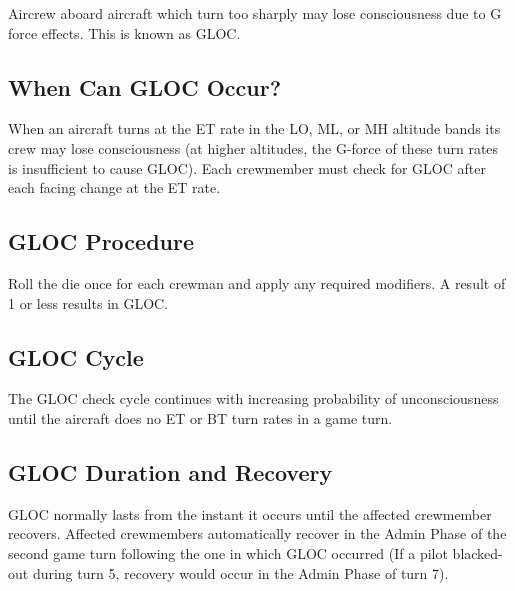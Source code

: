 \begin{advancedrules}
    Aircrew aboard aircraft which turn too sharply may lose consciousness due to G force effects. This is known as GLOC.

    \subsection{When Can GLOC Occur?}
    When an aircraft turns at the ET rate in the LO, ML, or MH altitude bands its crew may lose consciousness (at higher altitudes, the G-force of these turn rates is insufficient to cause GLOC). Each crewmember must check for GLOC after each facing change at the ET rate.


    \subsection{GLOC Procedure}
    Roll the die once for each crewman and apply any required modifiers. A result of 1 or less results in GLOC. 

    \subsection{GLOC Cycle} The GLOC check cycle continues with increasing probability of unconsciousness until the aircraft does no ET or BT turn rates in a game turn.

    \subsection{GLOC Duration and Recovery}
     GLOC normally lasts from the instant it occurs until the affected crewmember recovers. Affected crewmembers automatically recover in the Admin Phase of the second game turn following the one in which GLOC occurred (If a pilot blacked-out during turn 5, recovery would occur in the Admin Phase of turn 7).


\end{advancedrules}
